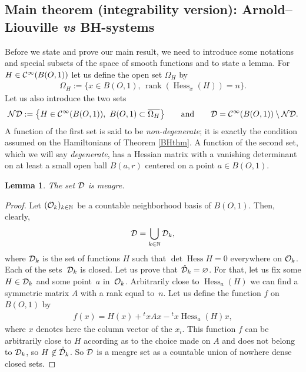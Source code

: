 \documentclass[pdftex]{sigma}%
\numberwithin{equation}{section}
\newtheorem{Lemma}[Theorem]{Lemma}
\begin{document}
\subsection{Main theorem (integrability version): Arnold--Liouville {\it\bfseries vs} BH-systems}

Before we state and prove our main result, we need to introduce some notations and special subsets of the space of smooth functions and to state a lemma.
For $H\in{\cal C}^\infty(B(O,1))$ let us define the open set $\Omega_H$ by
\begin{gather*}
\Omega_H:=\big\{x\in B(O,1),\, \operatorname{rank}(\operatorname{Hess}_x(H))=n\big\}.
\end{gather*}
Let us also introduce the two sets
\begin{gather*}
{\cal ND}:=\big\{H\in {\cal C}^\infty(B(O,1)),\ B(O,1)\subset\overline{\Omega_H}\big\}\qquad \text{and}\qquad {\cal D}={\cal C}^\infty(B(O,1))\setminus{\cal ND}.
\end{gather*}
A function of the first set is said to be {\it non-degenerate}; it is exactly the condition assumed on the Hamiltonians of Theorem \ref{BHthm}. A function of the second set, which we will say {\it degenerate}, has a Hessian matrix with a vanishing determinant on at least a small open ball $B(a,r)$ centered on a point $a\in B(O,1)$.

\begin{Lemma}
	The set ${\cal D}$ is meagre.
\end{Lemma}

\begin{proof}
	Let $({\cal O}_k)_{k\in\mathbb{N}}$ be a countable neighborhood basis of $B(O,1)$. Then, clearly,
\begin{gather*}
{\cal D}=\bigcup_{k\in\mathbb{N}}{\cal D}_k,
\end{gather*}
	where ${\cal D}_k$ is the set of functions $H$ such that $\det\operatorname{Hess}H=0$ everywhere on ${\cal O}_k$. Each of the sets~${\cal D}_k$ is closed. Let us prove that $\mathring{\cal D}_k=\varnothing$. For that, let us fix some
	$H\in{\cal D}_k$ and some point~$a$ in~${\cal O}_k$.
	Arbitrarily close to $\operatorname{Hess}_a(H)$ we can find a symmetric matrix $A$ with a rank equal to~$n$. Let us define the function $f$ on $B(O,1)$ by
\begin{gather*}
f(x)=H(x)+{}^txAx-{}^tx\operatorname{Hess}_a(H)x,
\end{gather*}
	where $x$ denotes here the column vector of the $x_i$.
	This function $f$ can be arbitrarily close to $H$ according as to the choice made on $A$ and does not belong to ${\cal D}_k$, so $H\not\in\mathring{\cal D}_k$. So ${\cal D}$ is a meagre set as a countable union of nowhere dense closed sets.
\end{proof}
\end{document}
